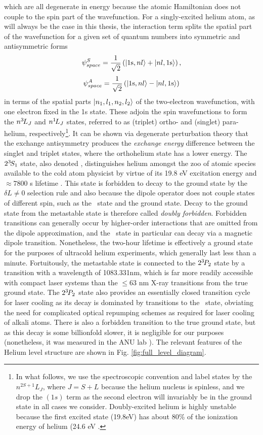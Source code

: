 	\noindent which are all degenerate in energy because the atomic Hamiltonian does not couple to the spin part of the wavefunction.
	For a singly-excited helium atom, as will always be the case in this thesis, the interaction term splits the spatial part of the wavefunction for a given set of quantum numbers into symmetric and antisymmetric forms
	$$
	\psi^{S}_{space} = \frac{1}{\sqrt{2}}\left(|1\textrm{s},nl\rangle +|nl,1\textrm{s}\rangle\right),
	$$
	$$
	\psi^{A}_{space} = \frac{1}{\sqrt{2}}\left(|1\textrm{s},nl\rangle  - |nl,1\textrm{s}\rangle\right)
	$$
	in terms of the spatial parts $|n_1,l_1,n_2,l_2\rangle$ of the two-electron wavefunction, with one electron fixed in the 1s state.
	These adjoin the spin wavefunctions to form the $n^{3\!} L_{J}$ and $n^{1\!} L_{J}$ states, referred to as (triplet) ortho- and (singlet) para-helium, respectively\footnote{In what follows, we use the spectroscopic convention and label states by the $n^{2S+1}L_J$, where $J=S+L$ because the helium nucleus is spinless, and we drop the $(1s)$ term as the second electron will invariably be in the ground state in all cases we consider. Doubly-excited helium is highly unstable because the first excited state (19.8eV) has about 80\% of the ionization energy of helium (24.6 eV \cite{Drake07}.}.
	It can be shown via degenerate perturbation theory that the exchange antisymmetry produces the \emph{exchange energy} difference between the singlet and triplet states, where the  orthohelium state has a lower energy.
	 The $2^{3\!}S_1$ state, also denoted \mhe, distinguishes helium amongst the zoo of atomic species available to the cold atom physicist by virtue of its 19.8 eV excitation energy and $\approx 7800$ s lifetime \cite{Hodgman09_mhe}.
	 This state is forbidden to decay to the ground state by the $\delta L\neq0$ selection rule and also because the dipole operator does not couple states of different spin, such as the \mhe~state and the ground state.
	Decay to the ground state from the metastable state is  therefore called \emph{doubly forbidden}.
	Forbidden transitions can generally occur by higher-order interactions that are omitted from the dipole approximation, and the \mhe~state in particular can decay via a magnetic dipole transition.
	Nonetheless, the two-hour lifetime is effectively a ground state for the purposes of ultracold helium experiments, which generally last less than a minute.
	Fortuitously, the metastable state is connected to the $2^{3\!} P_2$ state by a transition with a wavelength of 1083.331nm, which is far more readily accessible with compact laser systems than the $\leq 63$ nm X-ray transitions from the true ground state.
	The $2^{3\!} P_2$ state also provides an essentially closed transition cycle for laser cooling as its decay is dominated by transitions to the \mhe~state, obviating the need for complicated optical repumping schemes as required for laser cooling of alkali atoms.
	There is also a forbidden transition to the true ground state, but as this decay is some billionfold slower, it is negligible for our purposes (nonetheless, it was measured in the ANU lab \cite{Hodgman09_23P}). The relevant features of the Helium level structure are shown in Fig. \ref{fig:full_level_diagram}.

